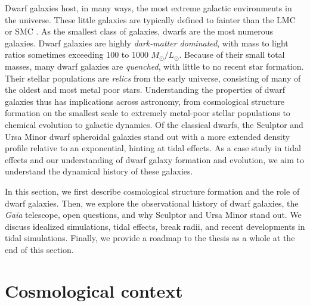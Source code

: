Dwarf galaxies host, in many ways, the most extreme galactic
environments in the universe. These little galaxies are typically
defined to fainter than the LMC or SMC \citep[\(M_V \gtrsim -18\) ,
e.g.,][]{hodge1971, mcconnachie2012}. As the smallest class of galaxies,
dwarfs are the most numerous galaxies. Dwarf galaxies are highly
\emph{dark-matter dominated}, with mass to light ratios sometimes
exceeding 100 to 1000 \(M_\odot/ L_\odot\). Because of their small total
masses, many dwarf galaxies are \emph{quenched}, with little to no
recent star formation. Their stellar populations are \emph{relics} from
the early universe, consisting of many of the oldest and most metal poor
stars. Understanding the properties of dwarf galaxies thus has
implications across astronomy, from cosmological structure formation on
the smallest scale to extremely metal-poor stellar populations to
chemical evolution to galactic dynamics. Of the classical dwarfs, the
Sculptor and Ursa Minor dwarf spheroidal galaxies stand out with a more
extended density profile relative to an exponential, hinting at tidal
effects. As a case study in tidal effects and our understanding of dwarf
galaxy formation and evolution, we aim to understand the dynamical
history of these galaxies.

In this section, we first describe cosmological structure formation and
the role of dwarf galaxies. Then, we explore the observational history
of dwarf galaxies, the \emph{Gaia} telescope, open questions, and why
Sculptor and Ursa Minor stand out. We discuss idealized simulations,
tidal effects, break radii, and recent developments in tidal
simulations. Finally, we provide a roadmap to the thesis as a whole at
the end of this section.

\section{Cosmological context}\label{cosmological-context}

